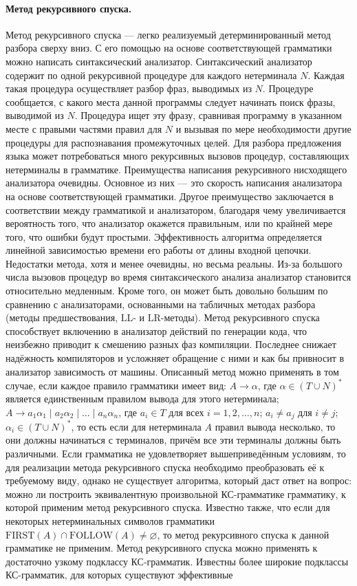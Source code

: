 \documentclass[a4paper,12pt]{article}
\begin{document}
\paragraph{Метод рекурсивного спуска.}
Метод рекурсивного спуска — легко реализуемый детерминированный метод разбора сверху вниз. С его помощью на основе соответствующей грамматики можно написать синтаксический анализатор. Синтаксический анализатор содержит по одной рекурсивной процедуре для каждого нетерминала \(N\). Каждая такая процедура осуществляет разбор фраз, выводимых из \(N\). Процедуре сообщается, с какого места данной программы следует начинать поиск фразы, выводимой из \(N\). Процедура ищет эту фразу, сравнивая программу в указанном месте с правыми частями правил для \(N\) и вызывая по мере необходимости другие процедуры для распознавания промежуточных целей. Для разбора предложения языка может потребоваться много рекурсивных вызовов процедур, составляющих нетерминалы в грамматике. Преимущества написания рекурсивного нисходящего анализатора очевидны. Основное из них — это скорость написания анализатора на основе соответствующей грамматики. Другое преимущество заключается в соответствии между грамматикой и анализатором, благодаря чему увеличивается вероятность того, что анализатор окажется правильным, или по крайней мере того, что ошибки будут простыми. Эффективность алгоритма определяется линейной зависимостью времени его работы от длины входной цепочки. Недостатки метода, хотя и менее очевидны, но весьма реальны. Из-за большого числа вызовов процедур во время синтаксического анализа анализатор становится относительно медленным. Кроме того, он может быть довольно большим по сравнению с анализаторами, основанными на табличных методах разбора (методы предшествования, \(\mathrm{LL}\)- и \(\mathrm{LR}\)-методы). Метод рекурсивного спуска способствует включению в анализатор действий по генерации кода, что неизбежно приводит к смешению разных фаз компиляции. Последнее снижает надёжность компиляторов и усложняет обращение с ними и как бы привносит в анализатор зависимость от машины. Описанный метод можно применять в том случае, если каждое правило грамматики имеет вид: \(A\to\alpha\), где \(\alpha\in(T\cup N)^*\) является единственным правилом вывода для этого нетерминала; \(A\to a_1\alpha_1\mid a_2\alpha_2\mid\ldots\mid a_n\alpha_n\), где \(a_i\in T\) для всех \(i=1,2,\ldots,n\); \(a_i\ne a_j\) для \(i\ne j\); \(\alpha_i\in(T\cup N)^*\), то есть если для нетерминала \(A\) правил вывода несколько, то они должны начинаться с терминалов, причём все эти терминалы должны быть различными. Если грамматика не удовлетворяет вышеприведённым условиям, то для реализации метода рекурсивного спуска необходимо преобразовать её к требуемому виду, однако не существует алгоритма, который даст ответ на вопрос: можно ли построить эквивалентную произвольной КС-грамматике грамматику, к которой применим метод рекурсивного спуска. Известно также, что если для некоторых нетерминальных символов грамматики \(\mathrm{FIRST}(A)\cap\mathrm{FOLLOW}(A)\ne\varnothing\), то метод рекурсивного спуска к данной грамматике не применим. Метод рекурсивного спуска можно применять к достаточно узкому подклассу КС-грамматик. Известны более широкие подклассы КС-грамматик, для которых существуют эффективные 
\end{document}
